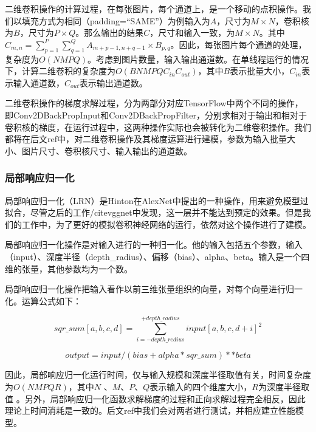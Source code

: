     二维卷积操作的计算过程，在每张图片，每个通道上，是一个移动的点积操作。我们以填充方式为相同（padding=“SAME”）为例输入为$ A $，尺寸为$ M \times N $，卷积核为$ B $，尺寸为$ P \times Q $。那么输出的结果$ C $，尺寸和输入一致，为$ M \times N $。其中 $ C_{m, n} = \sum_{p=1}^P\sum_{q=1}^Q{A_{m+p-1,n+q-1} \times B_{p,q}} $。因此，每张图片每个通道的处理，复杂度为$ O(N M P Q) $。考虑到图片数量，输入输出通道数。在单线程运行的情况下，计算二维卷积的复杂度为$ O(B N M P Q C_{in} C_{out}) $，其中$ B $表示批量大小，$ C_{in} $表示输入通道数，$ C_{out} $表示输出通道数。
    
    二维卷积操作的梯度求解过程，分为两部分对应TensorFlow中两个不同的操作，即Conv2DBackPropInput和Conv2DBackPropFilter，分别求相对于输出和相对于卷积核的梯度，在运行过程中，这两种操作实际也会被转化为二维卷积操作。我们都将在后文ref中，对二维卷积操作及其梯度运算进行建模，参数为输入批量大小、图片尺寸、卷积核尺寸、输入输出的通道数。
    
\subsubsection{局部响应归一化}
    局部响应归一化（LRN）是Hinton在AlexNet中提出的一种操作，用来避免模型过拟合，尽管之后的工作/cite{vggnet}中发现，这一层并不能达到预定的效果。但是我们的工作中，为了更好的模拟卷积神经网络的运行，依然对这个操作进行了建模。
    
    局部响应归一化操作是对输入进行的一种归一化。他的输入包括五个参数，输入（input）、深度半径（depth\_radius）、偏移（bias）、alpha、beta。输入是一个四维的张量，其他参数均为一个数。
    
    局部响应归一化操作把输入看作以前三维张量组织的向量，对每个向量进行归一化。运算公式如下：

    \begin{equation}
        sqr\_sum[a, b, c, d] = \sum_{i=-depth\_redius}^{+depth\_radius}input[a, b, c, d+i]^2
    \end{equation}

    \begin{equation}
        output = input / (bias + alpha * sqr\_sum) ** beta
    \end{equation}

    因此，局部响应归一化运行时间，仅与输入规模和深度半径取值有关，时间复杂度为$ O(N M P Q R) $，其中$ N $ 、$ M $、$ P $、$ Q $表示输入的四个维度大小，$ R $为深度半径取值 。另外，局部响应归一化函数求解梯度的过程和正向求解过程完全相反，因此理论上时间消耗是一致的。后文ref中我们会对两者进行测试，并相应建立性能模型。
    
    
    